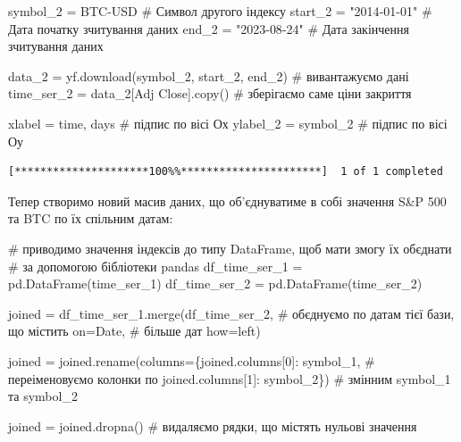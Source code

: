 \documentclass[
  letterpaper,
]{report}
\newenvironment{Shaded}{\begin{snugshade}}{\end{snugshade}}
\newcommand{\CommentTok}[1]{\textcolor[rgb]{0.37,0.37,0.37}{#1}}
\newcommand{\DecValTok}[1]{\textcolor[rgb]{0.68,0.00,0.00}{#1}}
\newcommand{\NormalTok}[1]{\textcolor[rgb]{0.00,0.23,0.31}{#1}}
\newcommand{\OperatorTok}[1]{\textcolor[rgb]{0.37,0.37,0.37}{#1}}
\newcommand{\StringTok}[1]{\textcolor[rgb]{0.13,0.47,0.30}{#1}}
\begin{document}
\begin{Shaded}
\begin{Highlighting}[]
\NormalTok{symbol\_2 }\OperatorTok{=} \StringTok{\textquotesingle{}BTC{-}USD\textquotesingle{}}       \CommentTok{\# Символ другого індексу}
\NormalTok{start\_2 }\OperatorTok{=} \StringTok{"2014{-}01{-}01"}     \CommentTok{\# Дата початку зчитування даних}
\NormalTok{end\_2 }\OperatorTok{=} \StringTok{"2023{-}08{-}24"}       \CommentTok{\# Дата закінчення зчитування даних}

\NormalTok{data\_2 }\OperatorTok{=}\NormalTok{ yf.download(symbol\_2, start\_2, end\_2)  }\CommentTok{\# вивантажуємо дані}
\NormalTok{time\_ser\_2 }\OperatorTok{=}\NormalTok{ data\_2[}\StringTok{\textquotesingle{}Adj Close\textquotesingle{}}\NormalTok{].copy()         }\CommentTok{\# зберігаємо саме ціни закриття}

\NormalTok{xlabel }\OperatorTok{=} \StringTok{\textquotesingle{}time, days\textquotesingle{}}      \CommentTok{\# підпис по вісі Ох }
\NormalTok{ylabel\_2 }\OperatorTok{=}\NormalTok{ symbol\_2        }\CommentTok{\# підпис по вісі Оу}
\end{Highlighting}
\end{Shaded}

\begin{verbatim}
[*********************100%%**********************]  1 of 1 completed
\end{verbatim}

Тепер створимо новий масив даних, що об'єднуватиме в собі значення S\&P
500 та BTC по їх спільним датам:

\begin{Shaded}
\begin{Highlighting}[]
\CommentTok{\# приводимо значення індексів до типу DataFrame, щоб мати змогу їх об\textquotesingle{}єднати }
\CommentTok{\# за допомогою бібліотеки pandas}
\NormalTok{df\_time\_ser\_1 }\OperatorTok{=}\NormalTok{ pd.DataFrame(time\_ser\_1) }
\NormalTok{df\_time\_ser\_2 }\OperatorTok{=}\NormalTok{ pd.DataFrame(time\_ser\_2)}


\NormalTok{joined }\OperatorTok{=}\NormalTok{ df\_time\_ser\_1.merge(df\_time\_ser\_2, }\CommentTok{\# об\textquotesingle{}єднуємо по датам тієї бази, що містить }
\NormalTok{                             on}\OperatorTok{=}\StringTok{\textquotesingle{}Date\textquotesingle{}}\NormalTok{,     }\CommentTok{\# більше дат}
\NormalTok{                             how}\OperatorTok{=}\StringTok{\textquotesingle{}left\textquotesingle{}}\NormalTok{)  }

\NormalTok{joined }\OperatorTok{=}\NormalTok{ joined.rename(columns}\OperatorTok{=}\NormalTok{\{joined.columns[}\DecValTok{0}\NormalTok{]: symbol\_1,  }\CommentTok{\# переіменовуємо колонки по }
\NormalTok{                                joined.columns[}\DecValTok{1}\NormalTok{]: symbol\_2\}) }\CommentTok{\# змінним symbol\_1 та symbol\_2}

\NormalTok{joined }\OperatorTok{=}\NormalTok{ joined.dropna()  }\CommentTok{\# видаляємо рядки, що містять нульові значення}
\end{Highlighting}
\end{Shaded}
\end{document}
